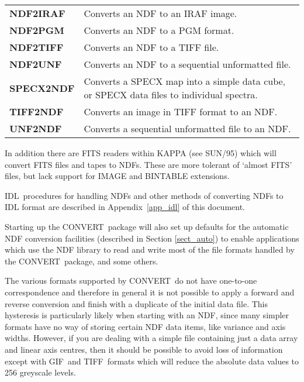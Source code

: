 \documentclass[twoside,11pt]{article}
\newcommand{\htmladdnormallink}[2]{#1}
\newcommand{\htmlref}[2]{#1}
\newcommand{\latex}[1]{#1}
\newcommand{\xref}[3]{#1}
\newcommand{\CONVERT}{{\footnotesize CONVERT}}
\newcommand{\GIFref}{\htmladdnormallink{GIF}{http://en.wikipedia.org/wiki/GIF}}
\newcommand{\KAPPA}{{\footnotesize KAPPA}}
\newcommand{\KAPPAref}{\xref{\KAPPA}{sun95}{}}
\newcommand{\IDLURL}{http://www.rsinc.com/idl/}
\newcommand{\IDLref}{\htmladdnormallink{IDL}{\IDLURL}}
\newcommand{\TIFFref}{\htmladdnormallink{TIFF}{http://en.wikipedia.org/wiki/TIFF}}
\begin{document}
\begin{center}
\begin{small}
\begin{tabular}{l@{ -- }p{125mm}}
{\bf \htmlref{NDF2IRAF}{NDF2IRAF}}
& Converts an NDF to an IRAF image. \\[\medskipamount]
{\bf \htmlref{NDF2PGM}{NDF2PGM}}
& Converts an NDF to a PGM format. \\[\medskipamount]
{\bf \htmlref{NDF2TIFF}{NDF2TIFF}}
& Converts an NDF to a TIFF file. \\[\medskipamount]
{\bf \htmlref{NDF2UNF}{NDF2UNF}}
& Converts an NDF to a sequential unformatted file. \\[\medskipamount]
{\bf \htmlref{SPECX2NDF}{SPECX2NDF}}
& Converts a SPECX map into a simple data cube, or SPECX data files to individual spectra. \\[\medskipamount]
{\bf \htmlref{TIFF2NDF}{TIFF2NDF}}
& Converts an image in TIFF format to an NDF. \\[\medskipamount]
{\bf \htmlref{UNF2NDF}{UNF2NDF}}
& Converts a sequential unformatted file to an NDF. \\[\medskipamount]
\end{tabular}
\end{small}
\end{center}

In addition there are FITS readers within 
\KAPPAref \latex{ (see SUN/95)}
which will convert FITS files and tapes to NDFs.
These are more tolerant of `almost FITS' files, but lack support for
IMAGE and BINTABLE extensions.

\IDLref\
procedures for handling NDFs and other methods of converting 
\htmlref{NDFs to IDL}{app_idl}
format are described in 
\latex{Appendix~\ref{app_idl} of} this document.

Starting up the \CONVERT\ package will also set up defaults for the
\htmlref{automatic NDF conversion facilities}{sect_auto}
\latex{(described in Section \ref{sect_auto})} to enable applications 
which use the NDF library to read and write most of the file formats handled 
by the \CONVERT\ package, and some others.

The various formats supported by \CONVERT\ do not have
one-to-one correspondence and therefore in general it is not possible to
apply a forward and reverse conversion and finish with a duplicate of
the initial data file.  This hysteresis is particularly likely when
starting with an NDF, since many simpler formats have no way of storing
certain NDF data items, like variance and axis widths.  However, if you
are dealing with a simple file containing just a data array and linear
axis centres, then it should be possible to avoid loss of information except
with \GIFref\ and \TIFFref\ formats which will reduce the absolute data values to 256
greyscale levels.
\end{document}
